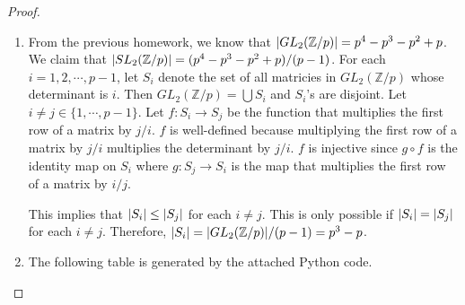 \documentclass[12pt, psamsfonts]{amsart}
\theoremstyle{definition}
\theoremstyle{remark}
\numberwithin{equation}{section}
\begin{document}
\begin{proof}
  $ $
  \begin{enumerate}
    \item
      From the previous homework, we know that $\abs{GL_2(\mathbb{Z}/p)} = p^4 - p^3 - p^2 + p$.
      We claim that $\abs{SL_2(\mathbb{Z}/p)} = (p^4 - p^3 - p^2 + p) / (p - 1)$.
      For each $i = 1, 2, \cdots, p - 1$, let $S_i$ denote the set of all matricies in $GL_2(\mathbb{Z}/p)$ whose determinant is $i$.
      Then $GL_2(\mathbb{Z}/p) = \bigcup S_i$ and $S_i$'s are disjoint.
      Let $i \ne j \in \{ 1, \cdots, p - 1 \}$.
      Let $f: S_i \rightarrow S_j$ be the function that multiplies the first row of a matrix by $j / i$.
      $f$ is well-defined because multiplying the first row of a matrix by $j / i$ multiplies the determinant by $j /i$.
      $f$ is injective since $g \circ f$ is the identity map on $S_i$ where $g: S_j \rightarrow S_i$ is the map that multiplies the first row of a matrix by $i / j$.

      This implies that $\abs{S_i} \leq \abs{S_j}$ for each $i \neq j$.
      This is only possible if $\abs{S_i} = \abs{S_j}$ for each $i \ne j$.
      Therefore, $\abs{S_i} = \abs{GL_2(\mathbb{Z}/p)} / (p - 1) = p^3 - p$.
    \item
      The following table is generated by the attached Python code.


\end{enumerate}
\end{proof}
\end{document}

